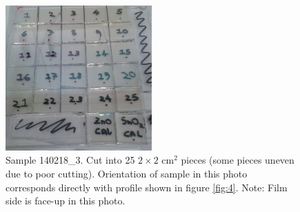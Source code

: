 \documentclass{article}
\begin{document}
\begin{figure}[h]
    \centering
        \includegraphics[width = 0.5\textwidth]{figure1.jpg}
    \caption{Sample 140218\_3. Cut into 25 $2\times2$ cm$^2$ pieces (some pieces uneven due to poor cutting). Orientation of sample in this photo corresponds directly with profile shown in figure \ref{fig:4}. Note: Film side is face-up in this photo.  }
\end{figure}
\end{document}
